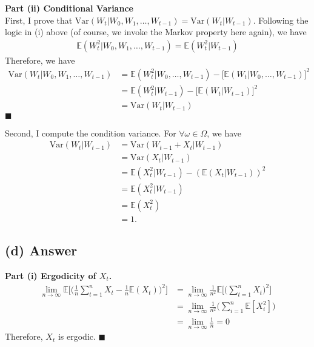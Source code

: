 \documentclass[11pt]{article}
\theoremstyle{definition}
\theoremstyle{boldtitle} %
\numberwithin{equation}{section}
\numberwithin{figure}{section}
\numberwithin{table}{section}
\begin{document}
\vspace{5mm}
\noindent \textbf{Part (ii) Conditional Variance} 
\\
\noindent First, I prove that $\text{Var}(W_t | W_0, W_1, \dots, W_{t-1}) = \text{Var}(W_t | W_{t-1})$.
Following the logic in (i) above (of course, we invoke the Markov property here again), we have 
\begin{align}
\mathbb{E}(W_t^2 | W_0, W_1, \dots, W_{t-1}) = \mathbb{E}(W_t^2 | W_{t-1})
\end{align}
Therefore, we have 
\begin{align*}
\text{Var}(W_t | W_0, W_1, \dots, W_{t-1}) & = \mathbb{E}(W_t^2 | W_0, \dots, W_{t-1}) - \bigg[\mathbb{E}(W_t | W_0, \dots, W_{t-1})\bigg]^2 \\ 
& = \mathbb{E}(W_t^2 | W_{t-1}) - \bigg[\mathbb{E}(W_t | W_{t-1})\bigg]^2 \\
& = \text{Var}(W_t | W_{t-1})
\end{align*}
\(\blacksquare\)



\noindent Second, I compute the condition variance. For $\forall \omega \in \Omega$, we have
\begin{align*}
\text{Var}(W_t | W_{t-1}) & = \text{Var}(W_{t-1} + X_t | W_{t-1}) \\ 
& = \text{Var}(X_t | W_{t-1}) \\
& = \mathbb{E}(X_t^2 | W_{t-1}) - (\mathbb{E}(X_t | W_{t-1}))^2 \\  
& = \mathbb{E}(X_t^2 | W_{t-1}) \\ 
& = \mathbb{E}(X_t^2) \\ 
& = 1.
\end{align*}


\subsection{(d) Answer}
\noindent \textbf{Part (i) Ergodicity of $X_t$.}
\begin{align*}
  \lim_{n \rightarrow \infty} \mathbb{E} \bigg[\bigg(\frac{1}{n} \sum_{t=1}^{n} X_t - \frac{1}{n} \mathbb{E}(X_t) \bigg)^2 \bigg] 
  & =  \lim_{n \rightarrow \infty}  \frac{1}{n^2} \mathbb{E} \bigg[\bigg(\sum_{t=1}^{n} X_t \bigg)^2 \bigg] \\
  & = \lim_{n \rightarrow \infty}  \frac{1}{n^2}  \bigg(\sum_{i=1}^{n} \mathbb{E} [X_i^2] \bigg) \\
  & =  \lim_{n \rightarrow \infty} \frac{1}{n} = 0
\end{align*}
\noindent Therefore, $X_t$ is ergodic. \(\blacksquare\)
\end{document}
